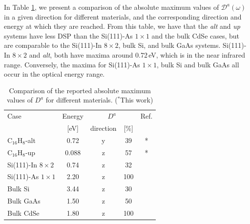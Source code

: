 \documentclass[pss]{wiley2sp} %
\begin{document}
In Table \ref{tab:dacomp}, we present a comparison of the absolute maximum
values of $\mathcal{D}^{a}(\omega)$ in a given direction for different
materials, and the corresponding direction and energy at which they are
reached. From this table, we have that the \emph{alt} and \emph{up} systems
have less DSP than the Si(111)-As $1\times1$ and the bulk CdSe cases, but are
comparable to the Si(111)-In $8\times2$, bulk Si, and bulk GaAs systems.
Si(111)-In $8\times2$ and \emph{alt}, both have maxima around 0.72\,eV, which
is in the near infrared range. Conversely, the maxima for Si(111)-As
$1\times1$, bulk Si and bulk GaAs all occur in the optical energy range.
\begin{table}[b]
\centering
\sidecaption
\begin{tabular}{lcccc}
\hline
\hline
Case & Energy &  \multicolumn{2}{c}{$D^{a}$} &  Ref.\\
\cline{3-4}   & [eV]   & direction & [\%] \\
\hline
C$_{16}$H$_{8}$-alt    & 0.72 & y & 39  & * \\
C$_{16}$H$_{8}$-up     & 0.088 & z & 57  & * \\
Si(111)-In $8\times2$  & 0.74 & z & 32  & \cite{arzatePRB14}\\
Si(111)-As $1\times1$  & 2.20 & z & 100 & \cite{mendozaPRB12}\\
Bulk Si                & 3.44 & z & 30  & \cite{nastosPRB07}\\
Bulk GaAs              & 1.50 & z & 50  & \cite{nastosPRB07,bhatPRB05}\\
Bulk CdSe              & 1.80 & z & 100 & \cite{nastosPRB07}\\
\hline
\hline
\end{tabular}
\caption[]{Comparison of the reported absolute maximum values of {$D^{a}$} for
different materials. ($^{*}$This work)}
\label{tab:dacomp}
\end{table}
\end{document}
